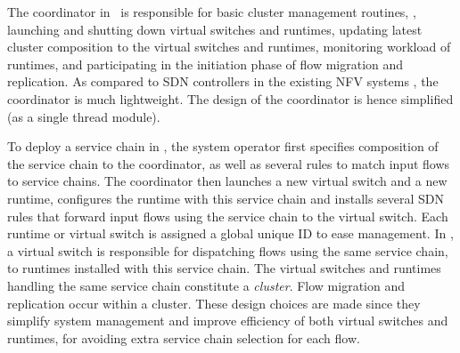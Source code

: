 The coordinator in \nfactor~is responsible for basic cluster management routines, %
\eg, launching and shutting down virtual switches and runtimes, updating latest cluster composition to the virtual switches and runtimes, monitoring workload of runtimes, %
 and participating in the initiation phase of flow migration and replication.
As compared to SDN controllers in the existing NFV systems \cite{gember2015opennf, rajagopalan2013split},
 the coordinator is much lightweight. %
The design of the coordinator is hence simplified (as a single thread module). %





To deploy a service chain in \nfactor, the system operator first specifies composition of the service chain to the coordinator, as well as several rules to match input flows to service chains. The coordinator then launches a new virtual switch and a new runtime, configures the runtime with this service chain and installs several SDN rules that forward input flows using the service chain to the virtual switch. %
Each runtime or virtual switch is assigned a global unique ID to ease management.  In \nfactor, a virtual switch is responsible for dispatching flows using the same service chain, to runtimes installed with this service chain. The virtual switches and runtimes handling the same service chain constitute a {\em cluster}. Flow migration and replication occur within a cluster. These design choices are made since they simplify system management and improve efficiency of both virtual switches and runtimes, for avoiding extra service chain selection for each flow.



